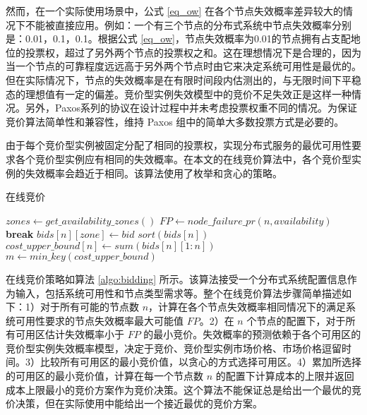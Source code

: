 然而，在一个实际使用场景中，公式 \eqref{eq_ow} 在各个节点失效概率差异较大的情况下不能被直接应用。例如：一个有三个节点的分布式系统中节点失效概率分别是：0.01，0.1，0.1。根据公式 \eqref{eq_ow}，节点失效概率为0.01的节点拥有占支配地位的投票权，超过了另外两个节点的投票权之和。这在理想情况下是合理的，因为当一个节点的可靠程度远远高于另外两个节点时由它来决定系统可用性是最优的。但在实际情况下，节点的失效概率是在有限时间段内估测出的，与无限时间下平稳态的理想值有一定的偏差。竞价型实例失效模型中的竞价不足失效正是这样一种情况。另外，Paxos系列的协议在设计过程中并未考虑投票权重不同的情况。为保证竞价算法简单性和兼容性，维持 Paxos 组中的简单大多数投票方式是必要的。

由于每个竞价型实例被固定分配了相同的投票权，实现分布式服务的最优可用性要求各个竞价型实例应有相同的失效概率。在本文的在线竞价算法中，各个竞价型实例的失效概率会趋近于相同。该算法使用了枚举和贪心的策略。

\begin{algorithm}
\caption{在线竞价}
\label{algo:bidding}
$zones\gets get\_availability\_zones()$
{
  $FP\gets node\_failure\_pr(n, availability)$
  {
    \ForEach{$bid \in [zone.spot\_prices[1], zone.on\_demand\_price)$}
    {
      {
        \textbf{break}
      }
    }
    $bids[n][zone]\gets bid$\;
  }
  $sort(bids[n])$\;
  $cost\_upper\_bound[n]\gets sum(bids[n][1:n])$\;
}
$m\gets min\_key(cost\_upper\_bound)$\;
\end{algorithm}

在线竞价策略如算法 \ref{algo:bidding} 所示。该算法接受一个分布式系统配置信息作为输入，包括系统可用性和节点类型需求等。整个在线竞价算法步骤简单描述如下：1）对于所有可能的节点数 $n$，计算在各个节点失效概率相同情况下的满足系统可用性要求的节点失效概率最大可能值 $FP$。2）在 $n$ 个节点的配置下，对于所有可用区估计失效概率小于 $FP$ 的最小竞价。失效概率的预测依赖于各个可用区的竞价型实例失效概率模型，决定于竞价、竞价型实例市场价格、市场价格逗留时间。3）比较所有可用区的最小竞价值，以贪心的方式选择可用区。4）累加所选择的可用区的最小竞价值，计算在每一个节点数 $n$ 的配置下计算成本的上限并返回成本上限最小的竞价方案作为竞价决策。这个算法不能保证总是给出一个最优的竞价决策，但在实际使用中能给出一个接近最优的竞价方案。

